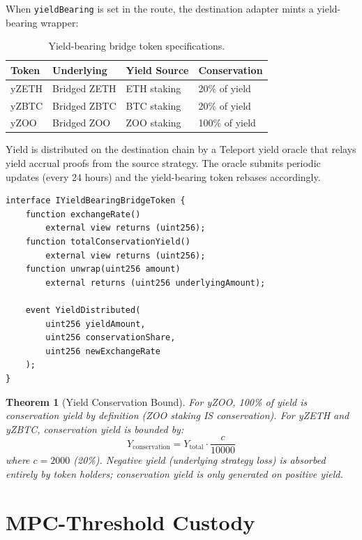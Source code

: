 \documentclass[11pt,letterpaper]{article}
\newtheorem{theorem}{Theorem}[section]
\begin{document}
When \texttt{yieldBearing} is set in the route, the destination adapter mints a yield-bearing wrapper:

\begin{table}[t]
\centering
\begin{tabular}{llll}
\toprule
\textbf{Token} & \textbf{Underlying} & \textbf{Yield Source} & \textbf{Conservation} \\
\midrule
yZETH & Bridged ZETH & ETH staking & 20\% of yield \\
yZBTC & Bridged ZBTC & BTC staking & 20\% of yield \\
yZOO & Bridged ZOO & ZOO staking & 100\% of yield \\
\bottomrule
\end{tabular}
\caption{Yield-bearing bridge token specifications.}
\label{tab:yield}
\end{table}

Yield is distributed on the destination chain by a Teleport yield oracle that relays yield accrual proofs from the source strategy. The oracle submits periodic updates (every 24 hours) and the yield-bearing token rebases accordingly.

\begin{lstlisting}[language=Solidity,caption=IYieldBearingBridgeToken interface]
interface IYieldBearingBridgeToken {
    function exchangeRate()
        external view returns (uint256);
    function totalConservationYield()
        external view returns (uint256);
    function unwrap(uint256 amount)
        external returns (uint256 underlyingAmount);

    event YieldDistributed(
        uint256 yieldAmount,
        uint256 conservationShare,
        uint256 newExchangeRate
    );
}
\end{lstlisting}

\begin{theorem}[Yield Conservation Bound]
For yZOO, 100\% of yield is conservation yield by definition (ZOO staking IS conservation). For yZETH and yZBTC, conservation yield is bounded by:
\begin{equation}
Y_{\text{conservation}} = Y_{\text{total}} \cdot \frac{c}{10000}
\end{equation}
where $c = 2000$ (20\%). Negative yield (underlying strategy loss) is absorbed entirely by token holders; conservation yield is only generated on positive yield.
\end{theorem}

\section{MPC-Threshold Custody}
\label{sec:custody}
\end{document}
